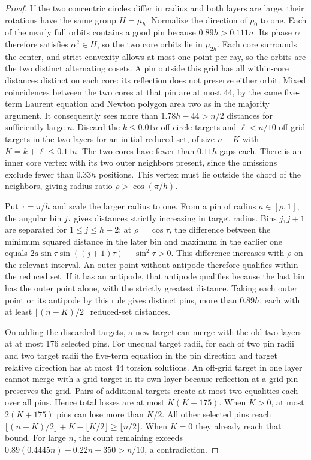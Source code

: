 \begin{proof}
If the two concentric circles differ in radius and both layers are large,
their rotations have the same group \(H=\mu_h\). Normalize the direction
of \(p_0\) to one. Each of the nearly full orbits contains a good pin
because \(0.89h>0.111n\). Its phase \(\alpha\) therefore satisfies
\(\alpha^2\in H\), so the two core orbits lie in \(\mu_{2h}\). Each core
surrounds the center, and strict convexity allows at most one point per
ray, so the orbits are the two distinct alternating cosets.
A pin outside this grid has all within-core distances distinct on each
core: its reflection does not preserve either orbit. Mixed coincidences
between the two cores at that pin are at most 44, by the same five-term
Laurent equation and Newton polygon area two as in the majority argument.
It consequently sees more than \(1.78h-44>n/2\) distances for sufficiently
large \(n\). Discard the \(k\le0.01n\) off-circle targets and \(\ell<n/10\)
off-grid targets in the two layers for an initial reduced set, of size
\(n-K\) with \(K=k+\ell\le0.11n\).
The two cores have fewer than \(0.11h\) gaps each. There is an inner core
vertex with its two outer neighbors present, since the omissions exclude
fewer than \(0.33h\) positions. This vertex must lie outside the chord
of the neighbors, giving radius ratio \(\rho>\cos(\pi/h)\).

Put \(\tau=\pi/h\) and scale the larger radius to one. From a pin of
radius \(a\in[\rho,1]\), the angular bin \(j\tau\) gives distances
strictly increasing in target radius. Bins \(j,j+1\) are separated for
\(1\le j\le h-2\): at \(\rho=\cos\tau\), the difference between the
minimum squared distance in the later bin and maximum in the earlier
one equals \(2a\sin\tau\sin((j+1)\tau)-\sin^2\tau>0\).
This difference increases with \(\rho\) on the relevant interval.
An outer point without antipode therefore qualifies within the reduced set.
If it has an antipode, that antipode qualifies because the last bin has the
outer point alone, with the strictly greatest distance. Taking each outer
point or its antipode by this rule gives distinct pins, more than \(0.89h\),
each with at least \(\lfloor(n-K)/2\rfloor\) reduced-set distances.

On adding the discarded targets, a new target can merge with the old
two layers at at most 176 selected pins. For unequal target radii, for
each of two pin radii and two target radii the five-term equation in
the pin direction and target relative direction has at most 44 torsion
solutions. An off-grid target in one layer cannot merge with a grid target
in its own layer because reflection at a grid pin preserves the grid.
Pairs of additional targets create at most two equalities each over all
pins. Hence total losses are at most \(K(K+175)\). When \(K>0\), at most
\(2(K+175)\) pins can lose more than \(K/2\). All other selected pins reach
\(\lfloor(n-K)/2\rfloor+K-\lfloor K/2\rfloor\ge\lfloor n/2\rfloor\).
When \(K=0\) they already reach that bound. For large \(n\), the count
remaining exceeds \(0.89(0.4445n)-0.22n-350>n/10\), a contradiction.
\end{proof}

